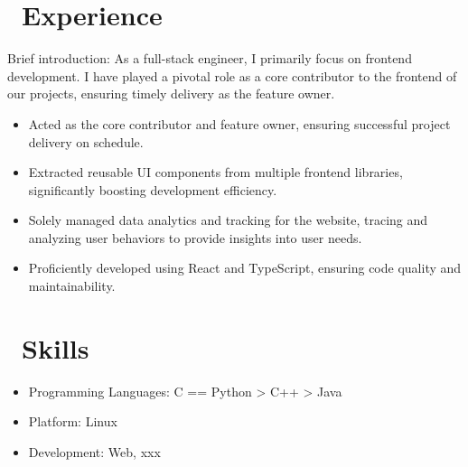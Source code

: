 \documentclass{resume}
\begin{document}



\section{\faUsers\ Experience}
\role{Software Developer}
Brief introduction: As a full-stack engineer, I primarily focus on frontend development. I have played a pivotal role as a core contributor to the frontend of our projects, ensuring timely delivery as the feature owner.
\begin{itemize}
  \item Acted as the core contributor and feature owner, ensuring successful project delivery on schedule.
  \item Extracted reusable UI components from multiple frontend libraries, significantly boosting development efficiency.
  \item Solely managed data analytics and tracking for the website, tracing and analyzing user behaviors to provide insights into user needs.
  \item Proficiently developed using React and TypeScript, ensuring code quality and maintainability.
\end{itemize}


\section{\faCogs\ Skills}
\begin{itemize}[parsep=0.5ex]
  \item Programming Languages: C == Python > C++ > Java
  \item Platform: Linux
  \item Development: Web, xxx
\end{itemize}
\end{document}
